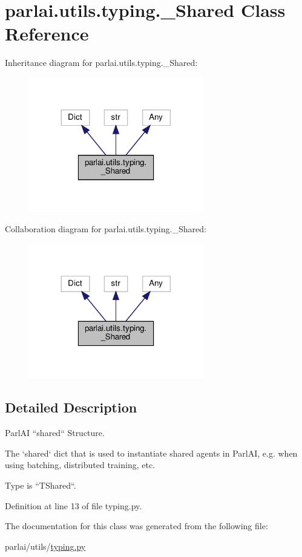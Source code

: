 \hypertarget{classparlai_1_1utils_1_1typing_1_1__Shared}{}\section{parlai.\+utils.\+typing.\+\_\+\+Shared Class Reference}
\label{classparlai_1_1utils_1_1typing_1_1__Shared}


Inheritance diagram for parlai.\+utils.\+typing.\+\_\+\+Shared\+:
\nopagebreak
\begin{figure}[H]
\begin{center}
\leavevmode
\includegraphics[width=215pt]{d6/d5c/classparlai_1_1utils_1_1typing_1_1__Shared__inherit__graph}
\end{center}
\end{figure}


Collaboration diagram for parlai.\+utils.\+typing.\+\_\+\+Shared\+:
\nopagebreak
\begin{figure}[H]
\begin{center}
\leavevmode
\includegraphics[width=215pt]{d6/d3e/classparlai_1_1utils_1_1typing_1_1__Shared__coll__graph}
\end{center}
\end{figure}


\subsection{Detailed Description}
\begin{DoxyVerb}ParlAI ``shared`` Structure.

The `shared` dict that is used to instantiate shared agents in ParlAI,
e.g. when using batching, distributed training, etc.

Type is ``TShared``.
\end{DoxyVerb}
 

Definition at line 13 of file typing.\+py.



The documentation for this class was generated from the following file\+:\begin{DoxyCompactItemize}
\item 
parlai/utils/\hyperlink{typing_8py}{typing.\+py}\end{DoxyCompactItemize}
